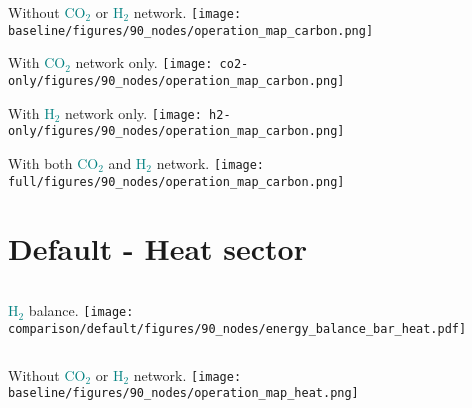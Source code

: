 \documentclass[12pt, aspectratio=169]{beamer}
\newcommand{\carbon}{\textcolor{teal}{CO$_2$}}
\newcommand{\hydrogen}{\textcolor{teal}{H$_2$}}
\begin{document}
\begin{frame}
    \begin{center}
    Without \carbon{} or \hydrogen{} network.
    \texttt{[image: baseline/figures/90\_nodes/operation\_map\_carbon.png]}
    \end{center}
\end{frame}


\begin{frame}
    \begin{center}
    With \carbon{} network only.
    \texttt{[image: co2-only/figures/90\_nodes/operation\_map\_carbon.png]}
    \end{center}
\end{frame}

\begin{frame}
    \begin{center}
    With \hydrogen{} network only.
    \texttt{[image: h2-only/figures/90\_nodes/operation\_map\_carbon.png]}
    \end{center}
\end{frame}


\begin{frame}
    \begin{center}
    With both \carbon{}  and \hydrogen{} network.
    \texttt{[image: full/figures/90\_nodes/operation\_map\_carbon.png]}
    \end{center}
\end{frame}





\section*{Default - Heat sector}

\begin{frame}
    \begin{columns}
        \hydrogen{} balance.
        \texttt{[image: comparison/default/figures/90\_nodes/energy\_balance\_bar\_heat.pdf]}
    \end{columns}
\end{frame}


\begin{frame}
    \begin{center}
    Without \carbon{} or \hydrogen{} network.
    \texttt{[image: baseline/figures/90\_nodes/operation\_map\_heat.png]}
    \end{center}
\end{frame}
\end{document}
